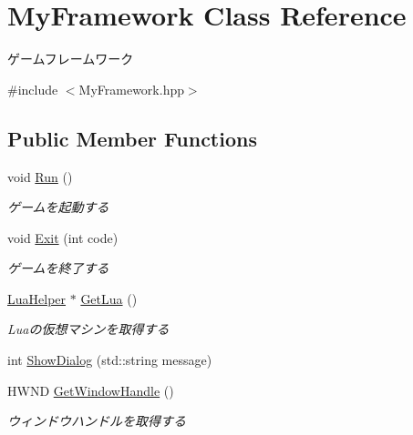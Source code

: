 \hypertarget{class_my_framework}{}\section{My\+Framework Class Reference}
\label{class_my_framework}


ゲームフレームワーク  




{\ttfamily \#include $<$My\+Framework.\+hpp$>$}

\subsection*{Public Member Functions}
\begin{DoxyCompactItemize}
\item 
void \hyperlink{class_my_framework_a6d6f988c3b97e1800c4e8ee24c883421}{Run} ()\hypertarget{class_my_framework_a6d6f988c3b97e1800c4e8ee24c883421}{}\label{class_my_framework_a6d6f988c3b97e1800c4e8ee24c883421}

\begin{DoxyCompactList}\small\item\em ゲームを起動する \end{DoxyCompactList}\item 
void \hyperlink{class_my_framework_a014990dbdb22c09d761ddcc82b742c2a}{Exit} (int code)\hypertarget{class_my_framework_a014990dbdb22c09d761ddcc82b742c2a}{}\label{class_my_framework_a014990dbdb22c09d761ddcc82b742c2a}

\begin{DoxyCompactList}\small\item\em ゲームを終了する \end{DoxyCompactList}\item 
\hyperlink{class_lua_helper}{Lua\+Helper} $\ast$ \hyperlink{class_my_framework_afd8f1dd92b2d7e9eb545dd3381f26054}{Get\+Lua} ()\hypertarget{class_my_framework_afd8f1dd92b2d7e9eb545dd3381f26054}{}\label{class_my_framework_afd8f1dd92b2d7e9eb545dd3381f26054}

\begin{DoxyCompactList}\small\item\em Luaの仮想マシンを取得する \end{DoxyCompactList}\item 
int \hyperlink{class_my_framework_ac950c533e91d2560cddcda68ece697ef}{Show\+Dialog} (std\+::string message)
\item 
H\+W\+ND \hyperlink{class_my_framework_aff398b6c21c8d0ce322264462c539325}{Get\+Window\+Handle} ()\hypertarget{class_my_framework_aff398b6c21c8d0ce322264462c539325}{}\label{class_my_framework_aff398b6c21c8d0ce322264462c539325}

\begin{DoxyCompactList}\small\item\em ウィンドウハンドルを取得する \end{DoxyCompactList}\end{DoxyCompactItemize}


